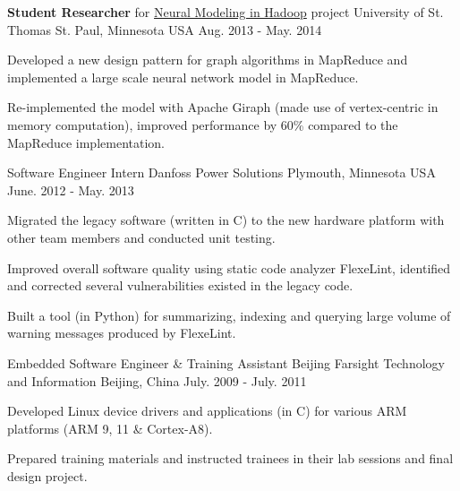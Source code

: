 \begin{cventries}
  \cventry
    {\textbf{Student Researcher} for
    \href{http://imsure.github.io/NeuralGiraph/}{Neural Modeling in
    Hadoop} project}
    {University of St. Thomas} %
    {St. Paul, Minnesota USA} %
    {Aug. 2013 - May. 2014} %
    {
      \begin{cvitems} %
      \item {Developed a new design pattern for graph algorithms in
    MapReduce and implemented a large scale neural network
    model in MapReduce.}
      \item {Re-implemented the model
       with Apache Giraph (made use of vertex-centric in memory computation), improved
    performance by 60\% compared to the MapReduce implementation.}
      \end{cvitems}
    }

  \cventry
    {Software Engineer Intern} %
    {Danfoss Power Solutions} %
    {Plymouth, Minnesota USA} %
    {June. 2012 - May. 2013} %
    {
      \begin{cvitems} %
        \item {Migrated the legacy software (written in C) to the new hardware
    platform with other team members and conducted unit testing.}
       \item {Improved overall software quality using static code analyzer FlexeLint, identified
    and corrected several vulnerabilities existed in the legacy code.}
           \item {Built a tool (in Python) for summarizing, indexing and
    querying large volume of warning messages produced by FlexeLint.}
      \end{cvitems}
    }

  \cventry
    {Embedded Software Engineer \& Training Assistant} %
    {Beijing Farsight Technology and Information} %
    {Beijing, China} %
    {July. 2009 - July. 2011} %
    {
      \begin{cvitems} %
        \item {Developed Linux device drivers and applications (in C) for various ARM
    platforms (ARM 9, 11 \& Cortex-A8).}
        \item {Prepared training materials and instructed trainees in
    their lab sessions and final design project.}
      \end{cvitems}
    }


\end{cventries}
